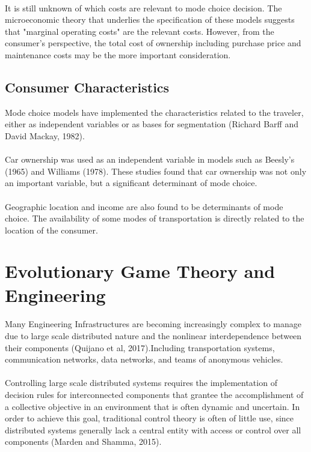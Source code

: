 \paragraph{}It is still unknown of which costs are relevant to mode choice decision. The microeconomic theory that underlies the specification of these models suggests that "marginal operating costs" are the relevant costs. However, from the consumer's perspective, the total cost of ownership including purchase price and maintenance costs may be the more important consideration.  

\subsection{Consumer Characteristics}
Mode choice models have implemented the characteristics related to the traveler, either as independent variables or as bases for segmentation (Richard Barff and David Mackay, 1982).
\paragraph{}
Car ownership was used as an independent variable in models such as Beesly's (1965) and Williams (1978). These studies found that car ownership was not only an important variable, but a significant determinant of mode choice.
\paragraph{}
Geographic location and income are also found to be determinants of mode choice. The availability of some modes of transportation is directly related to the location of the consumer.

\section{Evolutionary Game Theory and Engineering}
\paragraph{}Many Engineering Infrastructures are becoming increasingly complex to manage due to large scale distributed nature and the nonlinear interdependence between their components (Quijano et al, 2017).Including transportation systems, communication networks, data networks, and teams of anonymous vehicles.
\paragraph{}
Controlling large scale distributed systems requires the implementation of decision rules for interconnected components that grantee the accomplishment of a collective objective in an environment that is often dynamic and uncertain. In order to achieve this goal, traditional control theory is often of little use, since distributed systems generally lack a central  entity with access or control over all components (Marden and Shamma, 2015).
